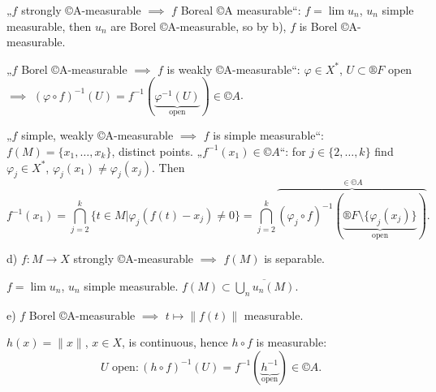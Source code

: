\documentclass[12pt]{article}					%
\begin{document}
\begin{tvrzeni}
\begin{dukazin}
		„$f$ strongly ©A-measurable $\implies$ $f$ Boreal ©A measurable“: $f = \lim u_n$, $u_n$ simple measurable, then $u_n$ are Borel ©A-measurable, so by b), $f$ is Borel ©A-measurable.

		„$f$ Borel ©A-measurable $\implies$ $f$ is weakly ©A-measurable“: $φ \in X^*$, $U \subset ®F$ open $\implies$ $(φ ∘ f)^{-1}(U) = f^{-1}(\underbrace{φ^{-1}(U)}_{\text{open}}) \in ©A$.

		„$f$ simple, weakly ©A-measurable $\implies$ $f$ is simple measurable“: $f(M) = \{x_1, …, x_k\}$, distinct points. „$f^{-1}(x_1) \in ©A$“: for $j \in \{2, …, k\}$ find $φ_j \in X^*$, $φ_j(x_1) ≠ φ_j(x_j)$. Then
		$$ f^{-1}(x_1) = \bigcap_{j=2}^k \{t \in M | φ_j(f(t) - x_j) ≠ 0\} = \bigcap_{j=2}^k \overbrace{(φ_j ∘ f)^{-1}(\underbrace{®F \setminus \{φ_j(x_j)\}}_{\text{open}})}^{\in ©A}. $$
	\end{dukazin}

	d) $f: M \rightarrow X$ strongly ©A-measurable $\implies$ $f(M)$ is separable.

	\begin{dukazin}
		$f = \lim u_n$, $u_n$ simple measurable. $f(M) \subset \overline{\bigcup_n u_n(M)}$.
	\end{dukazin}

	e) $f$ Borel ©A-measurable $\implies$ $t \mapsto \|f(t)\|$ measurable.

	\begin{dukazin}
		$h(x) = \|x\|$, $x \in X$, is continuous, hence $h ∘ f$ is measurable:
		$$ U \text{ open}: (h∘f)^{-1}(U) = f^{-1}(\underbrace{h^{-1}}_{\text{open}}) \in ©A. $$
	\end{dukazin}
\end{tvrzeni}
\end{document}
